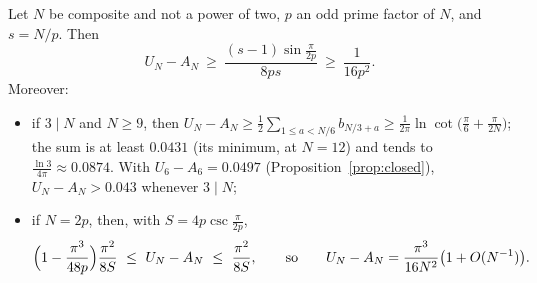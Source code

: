 \begin{proposition}\label{prop:deficit-lower}
Let $N$ be composite and not a power of two, $p$ an odd prime factor of $N$, and $s=N/p$. Then
\[
  U_N-A_N\ \ge\ \frac{(s-1)\sin\frac\pi{2p}}{8ps}\ \ge\ \frac1{16p^2}.
\]
Moreover:
\begin{itemize}
\item[\textup{(i)}] if $3\mid N$ and $N\ge9$, then
$U_N-A_N\ge\tfrac12\sum_{1\le a<N/6}b_{N/3+a}\ge\tfrac1{2\pi}\ln\cot\bigl(\tfrac\pi6+\tfrac\pi{2N}\bigr)$; the
sum is at least $0.0431$ (its minimum, at $N=12$) and tends to $\tfrac{\ln3}{4\pi}\approx0.0874$. With
$U_6-A_6=0.0497$ (Proposition~\ref{prop:closed}), $U_N-A_N>0.043$ whenever $3\mid N$;
\item[\textup{(ii)}] if $N=2p$, then, with $S=4p\csc\tfrac\pi{2p}$,
\[
  \Bigl(1-\frac{\pi^3}{48p}\Bigr)\frac{\pi^2}{8S}\ \le\ U_N-A_N\ \le\ \frac{\pi^2}{8S},\qquad\text{so}\qquad
  U_N-A_N=\frac{\pi^3}{16N^2}\bigl(1+O(N^{-1})\bigr).
\]
\end{itemize}
\end{proposition}

